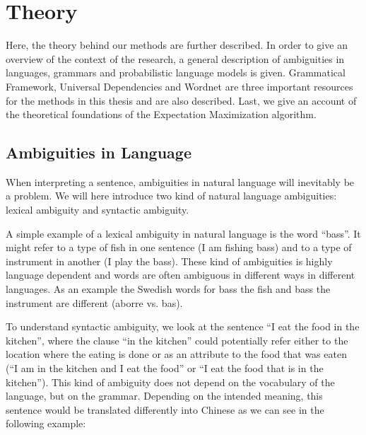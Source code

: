 \chapter{Theory}
\label{chapter:theory}

Here, the theory behind our methods are further described. In order to give an overview of the context of the research, a general description of ambiguities in languages, grammars and probabilistic language models is given. Grammatical Framework, Universal Dependencies and Wordnet are three important resources for the methods in this thesis and are also described. Last, we give an account of the theoretical foundations of the Expectation Maximization algorithm.


\section{Ambiguities in Language}
\label{section:ambiguities}


When interpreting a sentence, ambiguities in natural language will inevitably be a problem.  We will here introduce two kind of natural language ambiguities: lexical ambiguity and syntactic ambiguity. 

A simple example of a lexical ambiguity in natural language is the word ``bass''. It might refer to a type of fish in one sentence (I am fishing bass) and to a type of instrument in another (I play the bass). These kind of ambiguities is highly language dependent and words are often ambiguous in different ways in different languages. As an example the Swedish words for bass the fish and bass the instrument are different (aborre vs. bas).

To understand syntactic ambiguity, we look at the sentence ``I eat the food in the kitchen'', where the clause ``in the kitchen'' could potentially refer either to the location where the eating is done or as an attribute to the food that was eaten (``I am in the kitchen and I eat the food'' or ``I eat the food that is in the kitchen''). This kind of ambiguity does not depend on the vocabulary of the language, but on the grammar. Depending on the intended meaning, this sentence would be translated differently into Chinese as we can see in the following example:

